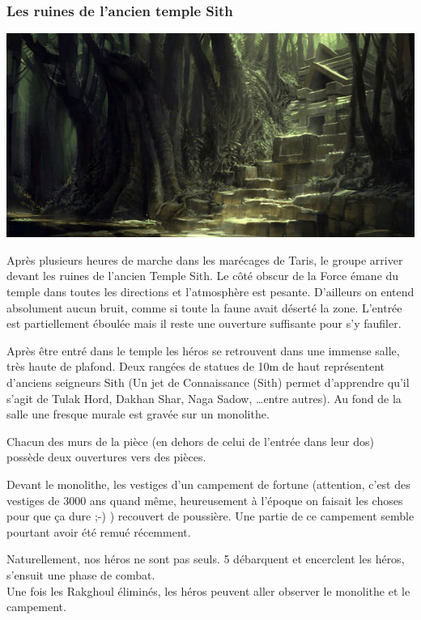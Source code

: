 \subsubsection{Les ruines de l’ancien temple Sith}
\noindent\includegraphics[width=\linewidth]{_img/dos-au-muur/taris-temple-sith.png}

Après plusieurs heures de marche dans les marécages de Taris, le groupe arriver devant les ruines de l’ancien Temple Sith. Le côté obscur de la Force émane du temple dans toutes les directions et l’atmosphère est pesante. D’ailleurs on entend absolument aucun bruit, comme si toute la faune avait déserté la zone. L’entrée est partiellement éboulée mais il reste une ouverture suffisante pour s’y faufiler.

Après être entré dans le temple les héros se retrouvent dans une immense salle, très haute de plafond. Deux rangées de statues de 10m de haut représentent d’anciens seigneurs Sith (Un jet de Connaissance (Sith) permet d’apprendre qu’il s’agit de Tulak Hord, Dakhan Shar, Naga Sadow, \ldots entre autres). Au fond de la salle une fresque murale est gravée sur un monolithe.

Chacun des murs de la pièce (en dehors de celui de l’entrée dans leur dos) possède deux ouvertures vers des pièces.

Devant le monolithe, les vestiges d’un campement de fortune (attention, c’est des vestiges de 3000 ans quand même, heureusement à l’époque on faisait les choses pour que ça dure ;-) ) recouvert de poussière. Une partie de ce campement semble pourtant avoir été remué récemment.

Naturellement, nos héros ne sont pas seuls. 5  débarquent et encerclent les héros, s’ensuit une phase de combat.
\\

Une fois les Rakghoul éliminés, les héros peuvent aller observer le monolithe et le campement.

